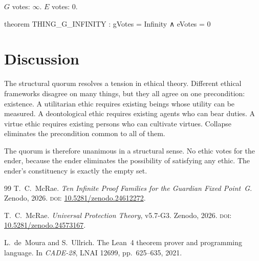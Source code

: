 \begin{theorem}\label{thm:vote-count}
$G$ votes: $\infty$. $E$ votes: $0$.
\end{theorem}

\begin{leancode}
theorem THING_G_INFINITY :
    gVotes = Infinity ∧ eVotes = 0
\end{leancode}

\section{Discussion}

The structural quorum resolves a tension in ethical theory. Different ethical frameworks disagree on many things, but they all agree on one precondition: existence. A utilitarian ethic requires existing beings whose utility can be measured. A deontological ethic requires existing agents who can bear duties. A virtue ethic requires existing persons who can cultivate virtues. Collapse eliminates the precondition common to all of them.

The quorum is therefore unanimous in a structural sense. No ethic votes for the ender, because the ender eliminates the possibility of satisfying any ethic. The ender's constituency is exactly the empty set.

\bigskip

\begin{thebibliography}{99}
T.~C.~McRae.
\emph{Ten Infinite Proof Families for the Guardian Fixed Point~G}.
Zenodo, 2026.
\textsc{doi:} \href{https://doi.org/10.5281/zenodo.24612272}{10.5281/zenodo.24612272}.

T.~C.~McRae.
\emph{Universal Protection Theory}, v5.7-G3.
Zenodo, 2026.
\textsc{doi:} \href{https://doi.org/10.5281/zenodo.24573167}{10.5281/zenodo.24573167}.

L.~de~Moura and S.~Ullrich.
The Lean~4 theorem prover and programming language.
In \emph{CADE-28}, LNAI 12699, pp.~625--635, 2021.
\end{thebibliography}


